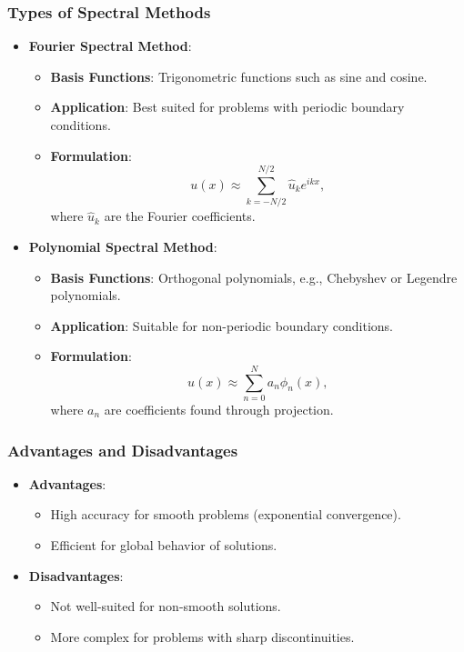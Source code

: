 \documentclass[12pt]{report} %
\begin{document}
\subsubsection{Types of Spectral Methods}
\begin{itemize}
    \item \textbf{Fourier Spectral Method}:
    \begin{itemize}
        \item \textbf{Basis Functions}: Trigonometric functions such as sine and cosine.
        \item \textbf{Application}: Best suited for problems with periodic boundary conditions.
        \item \textbf{Formulation}:
        \[
        u(x) \approx \sum_{k=-N/2}^{N/2} \hat{u}_k e^{ikx},
        \]
        where \( \hat{u}_k \) are the Fourier coefficients.
    \end{itemize}
    
    \item \textbf{Polynomial Spectral Method}:
    \begin{itemize}
        \item \textbf{Basis Functions}: Orthogonal polynomials, e.g., Chebyshev or Legendre polynomials.
        \item \textbf{Application}: Suitable for non-periodic boundary conditions.
        \item \textbf{Formulation}:
        \[
        u(x) \approx \sum_{n=0}^{N} a_n \phi_n(x),
        \]
        where \( a_n \) are coefficients found through projection.
    \end{itemize}
\end{itemize}

\subsubsection{Advantages and Disadvantages}
\begin{itemize}
    \item \textbf{Advantages}:
    \begin{itemize}
        \item High accuracy for smooth problems (exponential convergence).
        \item Efficient for global behavior of solutions.
    \end{itemize}
    \item \textbf{Disadvantages}:
    \begin{itemize}
        \item Not well-suited for non-smooth solutions.
        \item More complex for problems with sharp discontinuities.
    \end{itemize}
\end{itemize}
\end{document}
